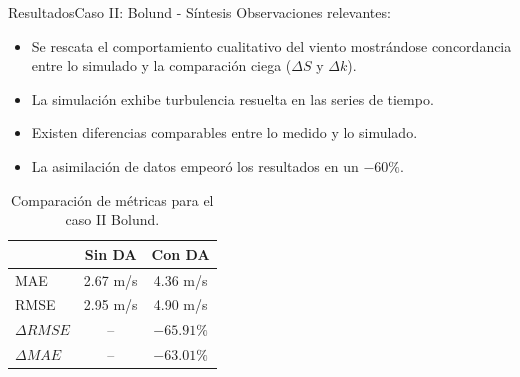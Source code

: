 \documentclass[mathserif,10pt]{beamer}
\begin{document}
\begin{frame}{Resultados}{Caso II: Bolund - Síntesis}
		Observaciones relevantes:
		\begin{itemize}
			\item Se rescata el comportamiento cualitativo del viento mostrándose concordancia entre lo simulado y la comparación ciega ($\Delta S$ y $\Delta k$).
			\item La simulación exhibe turbulencia resuelta en las series de tiempo.
			\item Existen diferencias comparables entre lo medido y lo simulado.
			\item La asimilación de datos empeoró los resultados en un $-60\%$.
		\end{itemize}
		\begin{table}[h!]
			\caption{Comparación de métricas para el caso II Bolund.}
			\label{tab:06_bol_mae_rmse}
			\centering%
			\begin{tabular}{lcc}
				\toprule
				& Sin DA & Con DA \\
				\midrule
				MAE & 2.67 m/s & 4.36 m/s \\
				RMSE & 2.95 m/s& 4.90 m/s\\
				$\Delta{RMSE}$&  -- & $-65.91\%$ \\
				$\Delta{MAE}$ &  -- & $-63.01\%$ \\
				\bottomrule
			\end{tabular}
		\end{table}
\end{frame}
\end{document}

